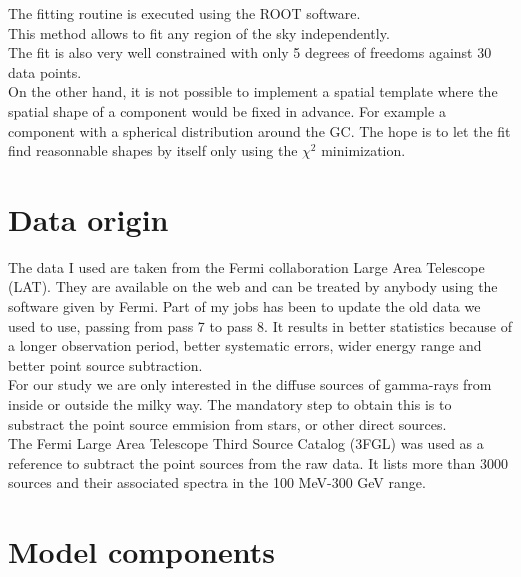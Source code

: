 The fitting routine is executed using the ROOT software. \\

This method allows to fit any region of the sky independently.\\

The fit is also very well constrained with only 5 degrees of freedoms against 30 data points.\\

On the other hand, it is not possible to implement a spatial template where the spatial shape of a component would be fixed in advance. For example a component with a spherical distribution around the GC. The hope is to let the fit find reasonnable shapes by itself only using the $\chi ^2$ minimization.\\



\section{Data origin}

The data I used are taken from the Fermi collaboration Large Area Telescope (LAT). They are available on the web and can be treated by anybody using the software given by Fermi.
Part of my jobs has been to update the old data we used to use, passing from pass 7 to pass 8. It results in better statistics because of a longer observation period, better systematic errors, wider energy range and better point source subtraction.\\

For our study we are only interested in the diffuse sources of gamma-rays from inside or outside the milky way. The mandatory step to obtain this is to substract the point source emmision from stars, or other direct sources.\\

The Fermi Large Area Telescope Third Source Catalog (3FGL) was used as a reference to subtract the point sources from the raw data. It lists more than 3000 sources and their associated spectra in the 100 MeV-300 GeV range.\\



\section{Model components}

